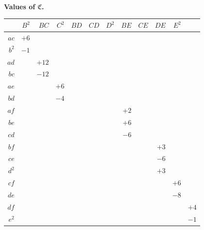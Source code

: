 \documentclass[11pt,a4paper]{book}
\begin{document}
\begin{center}
\renewcommand{\arraystretch}{1.15}
\textbf{Values of $\mathfrak{C}$.}
\begin{tabular}{r|rrrrrrrrrr}
& $B^{2}$ & $BC$ & $C^{2}$ & $BD$ & $CD$ & $D^{2}$ & $BE$ & $CE$ & $DE$ & $E^{2}$ \\
\hline
$ac$ & $+6$ \\
$b^{2}$ & $-1$ \\
$ad$ & & $+12$ \\
$bc$ & & $-12$ \\
$ae$ & & & $+6$ \\
$bd$ & & & $-4$ \\
$af$ & & & & & & & $+2$ \\
$be$ & & & & & & & $+6$ \\
$cd$ & & & & & & & $-6$ \\
$bf$ & & & & & & & & & $+3$ \\
$ce$ & & & & & & & & & $-6$ \\
$d^{2}$ & & & & & & & & & $+3$ \\
$cf$ & & & & & & & & & & $+6$ \\
$de$ & & & & & & & & & & $-8$ \\
$df$ & & & & & & & & & & & $+4$ \\
$e^{2}$ & & & & & & & & & & & $-1$
\end{tabular}
\end{center}
\end{document}
